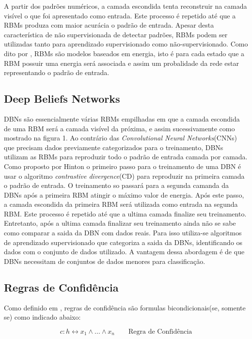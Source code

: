 \documentclass[a4paper, 12pt]{article}
\begin{document}
A partir dos padrões numéricos, a camada escondida tenta reconstruir na camada visível o que foi apresentado como entrada. Este processo é repetido até que a RBMs produza com maior acurácia o padrão de entrada. Apesar desta característica de não supervisionada de detectar padrões, RBMs podem ser utilizadas tanto para aprendizado supervisionado como não-supervisionado. Como dito por \cite{overviewRBM}, RBMs são modelos baseados em energia, isto é para cada estado que a RBM possuir uma energia será associada e assim um probalidade da rede estar representando o padrão de entrada.

\subsection{Deep Beliefs Networks}
DBNs são essencialmente várias RBMs empilhadas em que a camada escondida de uma RBM será a camada visível da próxima, e assim sucessivamente como mostrado na figura 1. Ao contrário das \textit{Convolutional Neural Networks}(CNNs) que precisam dados previamente categorizados para o treinamento, DBNs utilizam as RBMs para reproduzir todo o padrão de entrada camada por camada. Como proposto por Hinton\cite{Hinton} o primeiro passo para o treinamento de uma DBN é usar o algoritmo \textit{contrastive divergence}(CD) para reproduzir na primeira camada o padrão de entrada. O treinamento so passará para a segunda camanda da DBNs após a primeira RBM atingir o máximo valor de energia. Após este passo, a camada escondida da primeira RBM será utilizada como entrada na segunda RBM. Este processo é repetido até que a ultima camada finalize seu treinamento. Entretanto, após a ultima camada finalizar seu treinamento ainda não se sabe como comparar a saida da DBN com dados reais. Para isso utiliza-se algoritmos de aprendizado supervisionado que categoriza a saida da DBNs, identificando os dados com o conjunto de dados utilizado. A vantagem dessa abordagem é de que DBNs necessitam de conjuntos de dados menores para classificação.

\subsection{Regras de Confidência}
Como definido em \cite{Tran}, regras de confidência são formulas bicondicionais(se, somente se) como indicado abaixo:

\begin{equation}
c : h \leftrightarrow x_1 \wedge ... \wedge x_n
\qquad \text{Regra de Confidência}
\end{equation}
\end{document}
